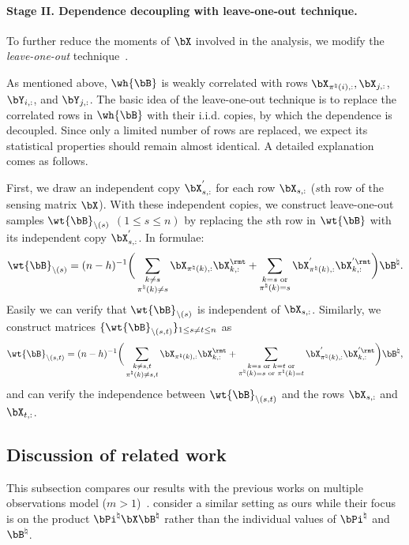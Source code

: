 \documentclass[11pt]{article}
\def \bPitrue {\bPi^{\natural}}
\def \bBtrue {\bB^{\natural}}
\def\wtminus#1#2{\wt{#1}_{\setminus (#2)}}
\begin{document}
\paragraph{Stage II. Dependence decoupling with leave-one-out technique.}
To further reduce the moments of $\bX$ involved in the analysis,
we  modify the \emph{leave-one-out}
technique~\citep{karoui2013asymptotic, el2013robust, karoui2018impact, chen2020noisy, sur2019likelihood, zhang2020optimal}.

As mentioned above, $\wh{\bB}$ is weakly correlated with
rows $\bX_{\pi^{\natural}(i), :}, \bX_{j, :}$,
$\bY_{i, :}$, and $\bY_{j, :}$.
The basic idea of the leave-one-out technique is to
replace the correlated rows in $\wh{\bB}$ with their i.i.d. copies, by which the dependence is decoupled.
Since only a limited number of rows are replaced, we expect its statistical properties should remain almost identical. A detailed explanation comes as follows.

First, we draw an independent copy $\bX_{s, :}^{'}$ for each row
$\bX_{s, :}$ ($s$th row of the sensing matrix $\bX$). With these
independent copies, we construct leave-one-out samples $\wtminus{\bB}{s}$ $(1\leq s \leq n)$
by replacing the $s$th row in $\wt{\bB}$ with its independent copy $\bX_{s, :}^{'}$.
In formulae:
\[
\wtminus{\bB}{s} =
(n-h)^{-1}\bigg(
\sum_{\substack{k \neq s \\ \pi^{\natural}(k) \neq s}} \bX_{\pi^{\natural}(k), :}\bX_{k, :}^{\rmt}
+ \sum_{\substack{k = s \textup{ or} \\  \pi^{\natural}(k) = s}} {\bX}^{'}_{\pi^{\natural}(k), :}{\bX}^{'\rmt}_{k, :}\bigg)\bBtrue.
\]
Easily we can verify that $\wtminus{\bB}{s}$ is independent of
$\bX_{s, :}$. Similarly, we construct matrices
$\{\wtminus{\bB}{s, t}\}_{1\leq s\neq t \leq n}$ as
\[
\wtminus{\bB}{s, t} =
(n-h)^{-1}\bigg(
\sum_{\substack{k \neq s, t\\ \pi^{\natural}(k) \neq s,t }} \bX_{\pi^{\natural}(k), :}\bX_{k, :}^{\rmt}
+ \sum_{\substack{k = s \textup{ or } k = t \textup{ or} \\ \pi^{\natural}(k) =s
  \textup{ or }\pi^{\natural}(k) = t}} {\bX}^{'}_{\pi^{\natural}(k), :}{\bX}^{'\rmt}_{k, :}\bigg)\bBtrue,
\]
and can verify the independence between $\wtminus{\bB}{s, t}$ and
the rows $\bX_{s, :}$ and $\bX_{t, :}$.

\newpage

\subsection{Discussion of related work}
\label{sec:multi_obs_related_work}
This subsection compares our results with
the previous works on multiple observations model
($m > 1$)~\citep{pananjady2017denoising, zhang2022permutation, slawski2020two}.
\citet{pananjady2017denoising} consider a similar
setting as ours while their focus is on
the product $\bPitrue\bX\bBtrue$ rather than the individual values of
$\bPitrue$ and $\bBtrue$.
\end{document}
